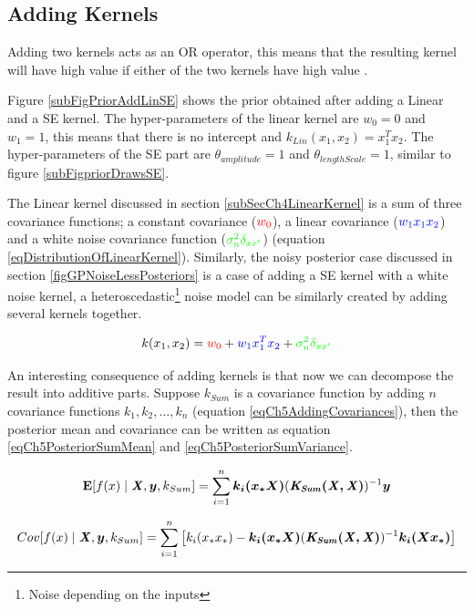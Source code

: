 \subsection{Adding Kernels} \label{subsecStructureKernelsAddingKernels}
Adding two kernels acts as an OR operator, this means that the resulting kernel will have high value if either of the two kernels have high value \cite{durrande2011additive}. 

Figure \ref{subFigPriorAddLinSE} shows the prior obtained after adding a Linear and a SE kernel. The hyper-parameters of the linear kernel are $w_{0}=0$ and $w_{1}=1$, this means that there is no intercept and $k_{Lin}(x_{1}, x_{2}) = x_{1}^Tx_{2}$. The hyper-parameters of the SE part are $\theta_{amplitude}=1$ and $\theta_{lengthScale}=1$, similar to figure \ref{subFigpriorDrawsSE}. 

The Linear kernel discussed in section \ref{subSecCh4LinearKernel} is a sum of three covariance functions; a constant covariance ($\textcolor{red}{w_{0}}$), a linear covariance ($\textcolor{blue}{w_{1}x_{1}x_{2}}$) and a white noise covariance function ($\textcolor{green}{\sigma_{n}^2\delta_{xx'}}$) (equation \ref{eqDistributionOfLinearKernel}). Similarly, the noisy posterior case discussed in section \ref{figGPNoiseLessPosteriors} is a case of adding a SE kernel with a white noise kernel, a heteroscedastic\footnote{Noise depending on the inputs} noise model can be similarly created by adding several kernels together.

\begin{equation}\label{eqDistributionOfLinearKernel}
k(x_{1}, x_{2}) = \textcolor{red}{w_{0}} + \textcolor{blue}{w_{1} x_{1}^T x_{2}} + \textcolor{green}{\sigma_{n}^2\delta_{xx'}}
\end{equation}

An interesting consequence of adding kernels is that now we can decompose the result into additive parts. Suppose $k_{Sum}$ is a covariance function by adding $n$ covariance functions $k_{1}, k_{2}, \ldots, k_{n}$ (equation \ref{eqCh5AddingCovariances}), then the posterior mean and covariance can be written as equation \ref{eqCh5PosteriorSumMean} and \ref{eqCh5PosteriorSumVariance}. 

\begin{align}\label{eqCh5PosteriorSumMean}
\mathbf{E}[f(x) \mid \bm{\mathit{X}}, \boldsymbol{y}, k_{Sum}] = \sum_{i=1}^{n} \boldsymbol{k_{i}(x_{*}X)}( \bm{\mathit{K_{Sum}(X, X)}})^{-1} \boldsymbol{y}
\end{align}

\begin{equation}\label{eqCh5PosteriorSumVariance}
Cov[f(x) \mid \bm{\mathit{X}}, \boldsymbol{y}, k_{Sum}] = \sum_{i=1}^{n} \left[ k_{i}(x_{*}x_{*}) - \boldsymbol{k_{i}(x_{*}X)}( \bm{\mathit{K_{Sum}(X, X)}} )^{-1} \boldsymbol{k_{i}(Xx_{*})} \right ]
\end{equation}

